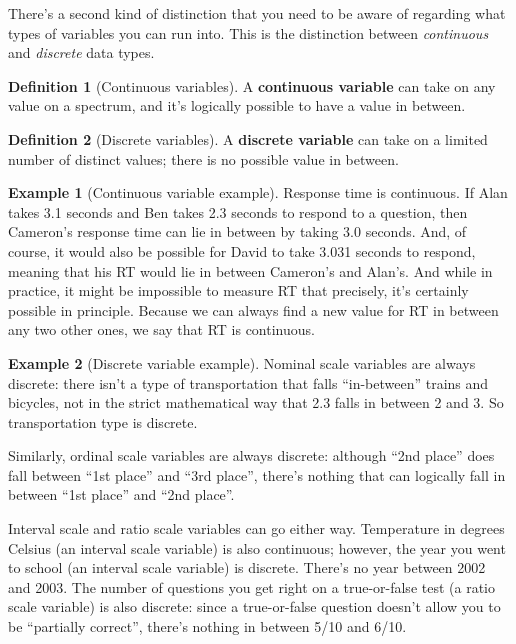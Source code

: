 \documentclass[
  11pt,
]{book}
\theoremstyle{definition}
\newtheorem{definition}{Definition}[chapter]
\theoremstyle{definition}
\newtheorem{example}{Example}[chapter]
\theoremstyle{definition}
\theoremstyle{definition}
\theoremstyle{remark}
\begin{document}
There's a second kind of distinction that you need to be aware of regarding what types of variables you can run into. This is the distinction between \emph{continuous} and \emph{discrete} data types.

\begin{definition}[Continuous variables]
\protect\hypertarget{def:defcontinuous}{}\label{def:defcontinuous}A \textbf{continuous variable} can take on any value on a spectrum, and it's logically possible to have a value in between.
\end{definition}

\begin{definition}[Discrete variables]
\protect\hypertarget{def:defdiscrete}{}\label{def:defdiscrete}A \textbf{discrete variable} can take on a limited number of distinct values; there is no possible value in between.
\end{definition}

\begin{example}[Continuous variable example]
\protect\hypertarget{exm:excontinuous}{}\label{exm:excontinuous}Response time is continuous. If Alan takes 3.1 seconds and Ben takes 2.3 seconds to respond to a question, then Cameron's response time can lie in between by taking 3.0 seconds. And, of course, it would also be possible for David to take 3.031 seconds to respond, meaning that his RT would lie in between Cameron's and Alan's. And while in practice, it might be impossible to measure RT that precisely, it's certainly possible in principle. Because we can always find a new value for RT in between any two other ones, we say that RT is continuous.
\end{example}

\begin{example}[Discrete variable example]
\protect\hypertarget{exm:exdiscrete}{}\label{exm:exdiscrete}Nominal scale variables are always discrete: there isn't a type of transportation that falls ``in-between'' trains and bicycles, not in the strict mathematical way that 2.3 falls in between 2 and 3. So transportation type is discrete.

Similarly, ordinal scale variables are always discrete: although ``2nd place'' does fall between ``1st place'' and ``3rd place'', there's nothing that can logically fall in between ``1st place'' and ``2nd place''.

Interval scale and ratio scale variables can go either way. Temperature in degrees Celsius (an interval scale variable) is also continuous; however, the year you went to school (an interval scale variable) is discrete. There's no year between 2002 and 2003. The number of questions you get right on a true-or-false test (a ratio scale variable) is also discrete: since a true-or-false question doesn't allow you to be ``partially correct'', there's nothing in between 5/10 and 6/10.
\end{example}
\end{document}

